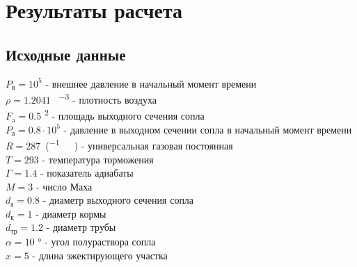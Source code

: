 \chapter{Результаты расчета}
\label{Chapter3}
\setlength{\parindent}{0pt}

\section{Исходные данные}
$P_\text{в}=10^5$ \si{} - внешнее давление в начальный момент времени \\
$\rho=1.2041$ \si{\per{}\cubed} - плотность воздуха \\
$F_\text{a}=0.5$ \si{\squared} - площадь выходного сечения сопла \\
$P_\text{а}=0.8\cdot 10^5$ \si{} - давление в выходном сечении сопла в начальный момент времени \\
$R=287$\si[per-mode = fraction]{\per(.)} - универсальная газовая постоянная \\
$T=293$ \si{} - температура торможения \\
$\varGamma=1.4$ - показатель адиабаты \\
$M=3$ - число Маха \\
$d_\text{а}=0.8$ \si{} - диаметр выходного сечения сопла \\
$d_\text{к}=1$ \si{} - диаметр кормы \\
$d_\text{тр}=1.2$ \si{} - диаметр трубы \\
$\alpha=10$ \si{\degree} - угол полураствора сопла \\
$x=5$ \si{} - длина эжектирующего участка \\